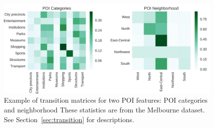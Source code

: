 \begin{figure}[t]
\includegraphics[width=\columnwidth]{fig/poi_transmat.png}
\caption{Example of transition matrices for two POI features: POI categories and neighborhood
These statistics are from the Melbourne dataset. See Section~\ref{sec:transition} for descriptions.}
\label{fig:transmat}
\end{figure}


